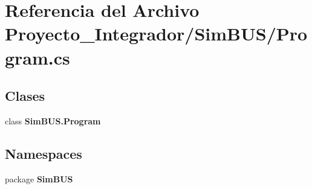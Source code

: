 \section{Referencia del Archivo Proyecto\-\_\-\-Integrador/\-Sim\-B\-U\-S/\-Program.cs}
\label{_program_8cs}
\subsection*{Clases}
\begin{DoxyCompactItemize}
\item 
class {\bf Sim\-B\-U\-S.\-Program}
\end{DoxyCompactItemize}
\subsection*{Namespaces}
\begin{DoxyCompactItemize}
\item 
package {\bf Sim\-B\-U\-S}
\end{DoxyCompactItemize}
